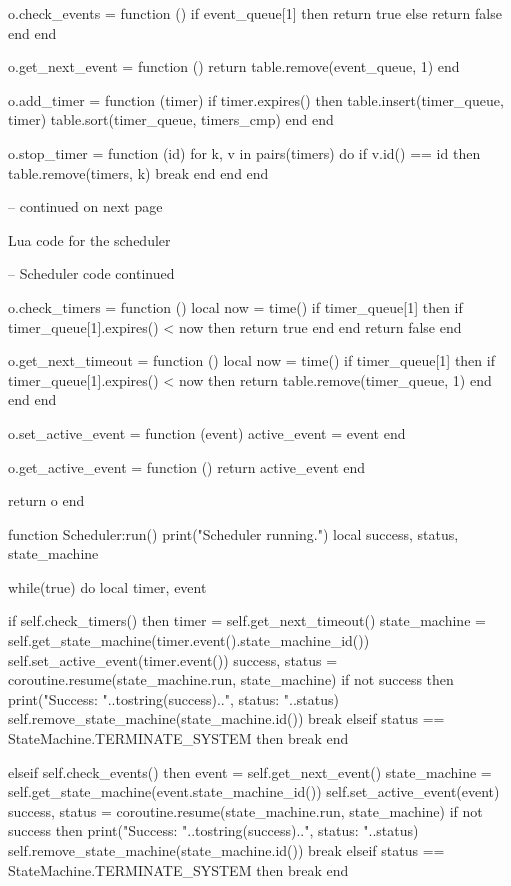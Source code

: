 \begin{appendices}
\begin{listing}[htp]
\begin{luacode}
	o.check_events = function ()
		if event_queue[1] then return true
		else return false end
	end

	o.get_next_event = function ()
		return table.remove(event_queue, 1)
	end

	o.add_timer = function (timer)
		if timer.expires() then
			table.insert(timer_queue, timer)
			table.sort(timer_queue, timers_cmp)
		end
	end

	o.stop_timer = function (id)
		for k, v in pairs(timers) do
			if v.id() == id then
				table.remove(timers, k)
				break
			end
		end
	end

-- continued on next page
\end{luacode}
	\caption{Lua code for the scheduler}
	\label{code:scheduler}
\end{listing}

\begin{listing}[htp]
\begin{luacode}
-- Scheduler code continued

	o.check_timers = function ()
		local now = time()
		if timer_queue[1] then
			if timer_queue[1].expires() < now then return true end
		end
		return false
	end

	o.get_next_timeout = function ()
		local now = time()
		if timer_queue[1] then
			if timer_queue[1].expires() < now then return table.remove(timer_queue, 1) end
		end
	end

	o.set_active_event = function (event)
		active_event = event
	end

	o.get_active_event = function ()
		return active_event
	end

	return o
end

function Scheduler:run()
	print("Scheduler running.")
	local success, status, state_machine

	while(true) do	
		local timer, event
		
		if self.check_timers() then
			timer = self.get_next_timeout()
			state_machine = self.get_state_machine(timer.event().state_machine_id())
			self.set_active_event(timer.event())
			success, status = coroutine.resume(state_machine.run, state_machine)
			if not success then
				print("Success: "..tostring(success)..", status: "..status)
				self.remove_state_machine(state_machine.id())
				break
			elseif status == StateMachine.TERMINATE_SYSTEM then
				break
			end

		elseif self.check_events() then
			event = self.get_next_event()
			state_machine = self.get_state_machine(event.state_machine_id())
			self.set_active_event(event)
			success, status = coroutine.resume(state_machine.run, state_machine)
			if not success then
				print("Success: "..tostring(success)..", status: "..status)
				self.remove_state_machine(state_machine.id())
				break
			elseif status == StateMachine.TERMINATE_SYSTEM then
				break
			end


\end{luacode}
\end{listing}
\end{appendices}
